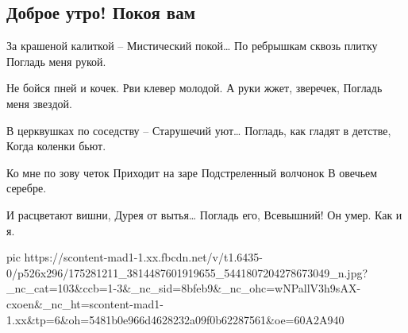  
 
 
 
 

\subsection{Доброе утро! Покоя вам}

За крашеной калиткой –
Мистический покой…
По ребрышкам сквозь плитку
Погладь меня рукой.

Не бойся пней и кочек.
Рви клевер молодой.
А руки жжет, зверечек,
Погладь меня звездой.

В церквушках по соседству –
Старушечий уют…
Погладь, как гладят в детстве,
Когда коленки бьют.

Ко мне по зову четок
Приходит на заре
Подстреленный волчонок
В овечьем серебре.

И расцветают вишни,
Дурея от вытья…
Погладь его, Всевышний!
Он умер. Как и я.


\ifcmt
  pic https://scontent-mad1-1.xx.fbcdn.net/v/t1.6435-0/p526x296/175281211_3814487601919655_5441807204278673049_n.jpg?_nc_cat=103&ccb=1-3&_nc_sid=8bfeb9&_nc_ohc=wNPallV3h9sAX-cxoen&_nc_ht=scontent-mad1-1.xx&tp=6&oh=5481b0e966d4628232a09f0b62287561&oe=60A2A940
\fi

